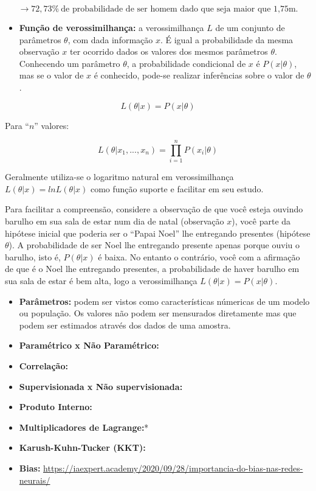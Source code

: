 \documentclass[
]{book}
\providecommand{\tightlist}{%
  \setlength{\itemsep}{0pt}\setlength{\parskip}{0pt}}
\begin{document}
\[→ 72,73\% \ \mbox{de probabilidade de ser homem dado que seja maior que 1,75m.}\]

\begin{itemize}
\tightlist
\item
  \textbf{Função de verossimilhança:} a verossimilhança \(L\) de um conjunto de parâmetros \(\theta\), com dada informação \(x\). É igual a probabilidade da mesma observação \(x\) ter ocorrido dados os valores dos mesmos parâmetros \(\theta\). Conhecendo um parâmetro \(\theta\), a probabilidade condicional de \(x\) é \(P(x|\theta)\), mas se o valor de \(x\) é conhecido, pode-se realizar inferências sobre o valor de \(\theta\) \citep{bolfarine2001introduccao}.
\end{itemize}

\begin{equation} 
 L(\theta |x)=P(x| \theta)
  \label{eq:fverossimilhanca}
\end{equation}

Para ``\(n\)'' valores:

\begin{equation} 
 L(\theta |x_1,..., x_n)=\prod_{i=1}^{n} P(x_i| \theta)
  \label{eq:fsumverossimilhanca}
\end{equation}

Geralmente utiliza-se o logaritmo natural em verossimilhança \(L(\theta |x)=ln L(\theta|x)\) como função suporte e facilitar em seu estudo.

Para facilitar a compreensão, considere a observação de que você esteja ouvindo barulho em sua sala de estar num dia de natal (observação \(x\)), você parte da hipótese inicial que poderia ser o ``Papai Noel'' lhe entregando presentes (hipótese \(\theta\)). A probabilidade de ser Noel lhe entregando presente apenas porque ouviu o barulho, isto é, \(P(\theta|x)\) é baixa. No entanto o contrário, você com a afirmação de que é o Noel lhe entregando presentes, a probabilidade de haver barulho em sua sala de estar é bem alta, logo a verossimilhança \(L(\theta|x)=P(x|\theta)\).

\begin{itemize}
\item
  \textbf{Parâmetros:} podem ser vistos como características númericas de um modelo ou população. Os valores não podem ser mensurados diretamente mas que podem ser estimados através dos dados de uma amostra.
\item
  \textbf{Paramétrico x Não Paramétrico:}
\item
  \textbf{Correlação:}
\item
  \textbf{Supervisionada x Não supervisionada:}
\item
  \textbf{Produto Interno:}
\item
  \textbf{Multiplicadores de Lagrange:}*
\item
  \textbf{Karush-Kuhn-Tucker (KKT):}
\item
  \textbf{Bias:}
  \url{https://iaexpert.academy/2020/09/28/importancia-do-bias-nas-redes-neurais/}
\end{itemize}
\end{document}
